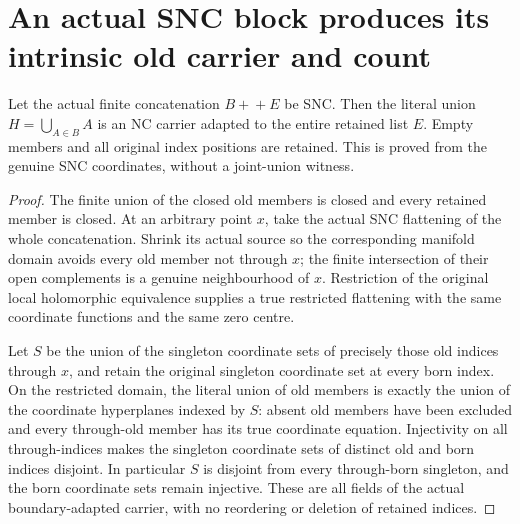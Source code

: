 \section{An actual SNC block produces its intrinsic old carrier and count}
\label{sec:nc-snc-block-carrier}

\begin{theorem}
\label{hir:nc-snc-old-block-boundary-adapted-union}
\leanok
Let the actual finite concatenation $B+\!+E$ be SNC. Then the literal union
$H=\bigcup_{A\in B}A$ is an NC carrier adapted to the entire retained list
$E$. Empty members and all original index positions are retained. This is
proved from the genuine SNC coordinates, without a joint-union witness.
\end{theorem}
\begin{proof}
The finite union of the closed old members is closed and every retained
member is closed. At an arbitrary point $x$, take the actual SNC flattening
of the whole concatenation. Shrink its actual source so the corresponding
manifold domain avoids every old member not through $x$; the finite
intersection of their open complements is a genuine neighbourhood of $x$.
Restriction of the original local holomorphic equivalence supplies a true
restricted flattening with the same coordinate functions and the same zero
centre.

Let $S$ be the union of the singleton coordinate sets of precisely those old
indices through $x$, and retain the original singleton coordinate set at
every born index. On the restricted domain, the literal union of old members
is exactly the union of the coordinate hyperplanes indexed by $S$: absent
old members have been excluded and every through-old member has its true
coordinate equation. Injectivity on all through-indices makes the singleton
coordinate sets of distinct old and born indices disjoint. In particular
$S$ is disjoint from every through-born singleton, and the born coordinate
sets remain injective. These are all fields of the actual boundary-adapted
carrier, with no reordering or deletion of retained indices.
\end{proof}


